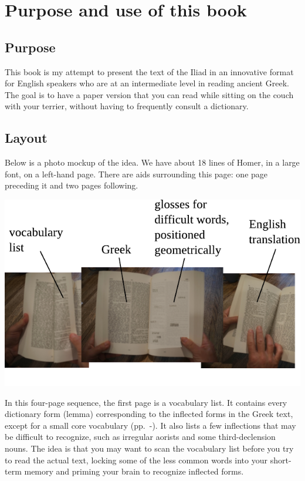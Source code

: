 \chapter*{Purpose and use of this book}

{\small

\section*{Purpose}

This book is my attempt to present the text of the Iliad in an innovative format
for English speakers who are at an intermediate level in reading ancient Greek.
The goal is to have a paper version that you can read while sitting on the couch
with your terrier, without having to frequently consult a dictionary.

\section*{Layout}

Below is a photo mockup of the
idea. We have about 18 lines of Homer, in a large font, on a left-hand
page. There are aids surrounding this page: one page preceding it and
two pages following.

\includegraphics{iliad/figs/manual}

In this four-page sequence, the first page is a vocabulary list. It
contains every dictionary form (lemma) corresponding to the inflected
forms in the Greek text, except for a small core vocabulary (pp.~\pageref{core-vocab}-\pageref{core-vocab-end}).
It also lists a few inflections that may be difficult to recognize, such as irregular
aorists and some third-declension nouns.
The idea is that you may want to scan the vocabulary
list before you try to read the actual text, locking some of the less
common words into your short-term memory and priming your brain to
recognize inflected forms.

}
